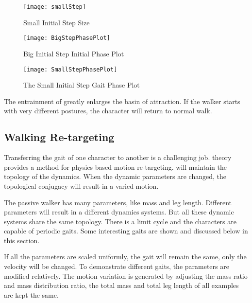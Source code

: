 \begin{figure}[!htbp]
  \begin{center}
      \texttt{[image: smallStep]}
    \caption{Small Initial Step Size}
    \label{fig:smallStepini}
\end{center}
\end{figure}


\begin{figure}[!htbp]
  \begin{center}
      \texttt{[image: BigStepPhasePlot]}
    \caption{Big Initial Step Initial Phase Plot}
    \label{fig:bigstepiniGaitPlot}
\end{center}
\end{figure}


\begin{figure}[!htbp]
  \begin{center}
      \texttt{[image: SmallStepPhasePlot]}
    \caption{The Small Initial Step Gait Phase Plot}
    \label{fig:smallstepiniPhasePlot}
\end{center}
\end{figure}

The entrainment of \cpg greatly enlarges the basin of attraction.
If the walker starts with very different postures, the character will return to normal walk.





\subsection{Walking Re-targeting}
Transferring the gait of one character to another is a challenging job.
\moit theory provides a method for physics based motion re-targeting.
\cpg will maintain the topology of the dynamics.
When the dynamic parameters are changed, the topological conjugacy will result in a varied motion.

The passive walker has many parameters, like mass and leg length.
Different parameters will result in a different dynamics systems.
But all these dynamic systems  share the same topology.
There is a limit cycle and the characters are capable of periodic gaits.
Some interesting gaits are shown and discussed below in this section.

If all the parameters are scaled  uniformly, the gait will remain the same, only the velocity will be changed.
To demonstrate different gaits, the parameters are modified relatively. 
The motion variation is generated by adjusting the mass ratio and mass distribution ratio, the total mass and total leg length of all examples are kept the same.



